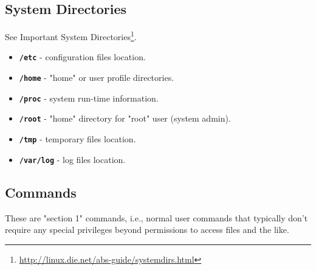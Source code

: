 \documentclass[10pt,american,]{book}
\renewcommand{\href}[2]{#2\footnote{\url{#1}}}
\numberwithin{figure}{chapter}
\begin{document}
\subsection*{System Directories}\label{system-directories}

See \href{http://linux.die.net/abs-guide/systemdirs.html}{Important
System Directories}.

\begin{itemize}
\item
  \textbf{\texttt{/etc}}
  - configuration files location.
\item
  \textbf{\texttt{/home}}
  - "home" or user profile directories.
\item
  \textbf{\texttt{/proc}}
  - system run-time information.
\item
  \textbf{\texttt{/root}}
  - "home" directory for "root" user (system admin).
\item
  \textbf{\texttt{/tmp}}
  - temporary files location.
\item
  \textbf{\texttt{/var/log}}
  - log files location.
\end{itemize}

\subsection*{Commands}\label{commands}

These are "section 1" commands, i.e., normal user commands that
typically don't require any special privileges beyond permissions to
access files and the like.
\end{document}
